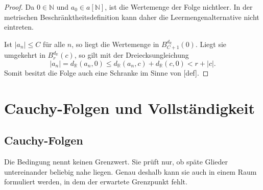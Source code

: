 \documentclass[main.tex]{subfiles}
\begin{document}
\begin{proof}
Da \(0\in\mathbb N\) und \(a_0\in a[\mathbb N]\), ist die Wertemenge der
Folge nichtleer. In der metrischen Beschränktheitsdefinition kann daher die
Leermengenalternative nicht eintreten.

Ist \(|a_n|\leq C\) für alle \(n\), so liegt die Wertemenge in
\(B_{C+1}^{d_{\mathbb R}}(0)\). Liegt sie umgekehrt in
\(B_r^{d_{\mathbb R}}(c)\), so gilt mit der Dreiecksungleichung
\[
 |a_n|=d_{\mathbb R}(a_n,0)
 \leq d_{\mathbb R}(a_n,c)+d_{\mathbb R}(c,0)
 <r+|c|.
\]
Somit besitzt die Folge auch eine Schranke im Sinne von
[def].
\end{proof}

\chapter{Cauchy-Folgen und Vollständigkeit}

\section{Cauchy-Folgen}


Die Bedingung nennt keinen Grenzwert. Sie prüft nur, ob späte Glieder
untereinander beliebig nahe liegen. Genau deshalb kann sie auch in einem Raum
formuliert werden, in dem der erwartete Grenzpunkt fehlt.
\end{document}
